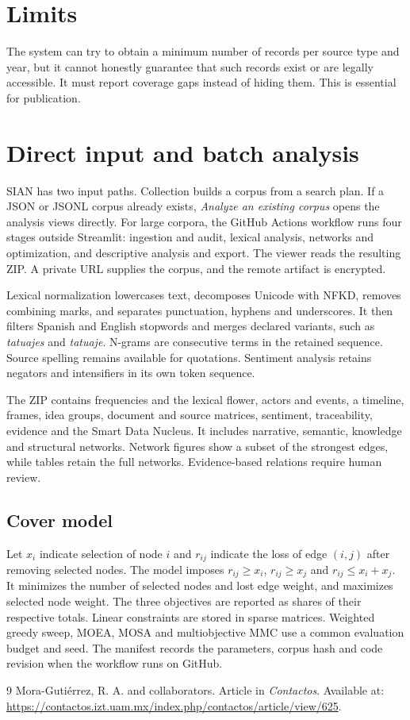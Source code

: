 \documentclass[11pt]{article}
\begin{document}
\section{Limits}

The system can try to obtain a minimum number of records per source type and year, but it cannot honestly guarantee that such records exist or are legally accessible. It must report coverage gaps instead of hiding them. This is essential for publication.


\section{Direct input and batch analysis}
SIAN has two input paths. Collection builds a corpus from a search plan. If a JSON or JSONL corpus already exists, \emph{Analyze an existing corpus} opens the analysis views directly. For large corpora, the GitHub Actions workflow runs four stages outside Streamlit: ingestion and audit, lexical analysis, networks and optimization, and descriptive analysis and export. The viewer reads the resulting ZIP. A private URL supplies the corpus, and the remote artifact is encrypted.

Lexical normalization lowercases text, decomposes Unicode with NFKD, removes combining marks, and separates punctuation, hyphens and underscores. It then filters Spanish and English stopwords and merges declared variants, such as \emph{tatuajes} and \emph{tatuaje}. N-grams are consecutive terms in the retained sequence. Source spelling remains available for quotations. Sentiment analysis retains negators and intensifiers in its own token sequence.

The ZIP contains frequencies and the lexical flower, actors and events, a timeline, frames, idea groups, document and source matrices, sentiment, traceability, evidence and the Smart Data Nucleus. It includes narrative, semantic, knowledge and structural networks. Network figures show a subset of the strongest edges, while tables retain the full networks. Evidence-based relations require human review.

\subsection{Cover model}
Let $x_i$ indicate selection of node $i$ and $r_{ij}$ indicate the loss of edge $(i,j)$ after removing selected nodes. The model imposes $r_{ij}\ge x_i$, $r_{ij}\ge x_j$ and $r_{ij}\le x_i+x_j$. It minimizes the number of selected nodes and lost edge weight, and maximizes selected node weight. The three objectives are reported as shares of their respective totals. Linear constraints are stored in sparse matrices. Weighted greedy sweep, MOEA, MOSA and multiobjective MMC use a common evaluation budget and seed. The manifest records the parameters, corpus hash and code revision when the workflow runs on GitHub.

\begin{thebibliography}{9}
Mora-Gutiérrez, R. A. and collaborators. Article in \emph{Contactos}. Available at: \url{https://contactos.izt.uam.mx/index.php/contactos/article/view/625}.
\end{thebibliography}


\end{document}
